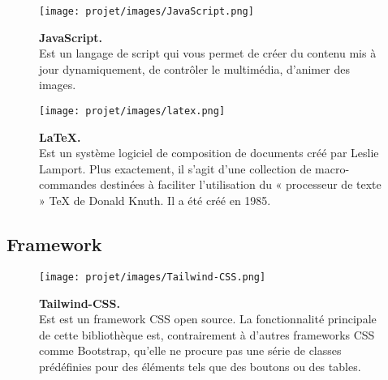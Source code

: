 \vspace{0.5cm}

\begin{figure}[H]
    \centering
    \begin{minipage}[c]{0.3\textwidth}
        \texttt{[image: projet/images/JavaScript.png]}
    \end{minipage}
    \hspace{1cm}
    \begin{minipage}[c]{0.6\textwidth}
        \textbf{JavaScript.}\\[0.5em]
       Est un langage de script qui vous permet de créer du contenu
mis à jour dynamiquement, de contrôler le multimédia, d’animer des
images. \cite{ref11}
    \end{minipage}
\end{figure}

\vspace{0.5cm}

\begin{figure}[H]
    \centering
    \begin{minipage}[c]{0.3\textwidth}
        \texttt{[image: projet/images/latex.png]}
    \end{minipage}
    \hspace{1cm}
    \begin{minipage}[c]{0.6\textwidth}
        \textbf{LaTeX.}\\[0.5em]
        Est un système logiciel de composition de documents créé par Leslie Lamport. Plus exactement, il s'agit d'une collection de macro-commandes destinées à faciliter l'utilisation du « processeur de texte » TeX de Donald Knuth. Il a été créé en 1985. \cite{ref12}
    \end{minipage}
\end{figure}
\subsection{Framework}
\begin{figure}[H]
    \centering
    \begin{minipage}[c]{0.3\textwidth}
        \texttt{[image: projet/images/Tailwind-CSS.png]}
    \end{minipage}
    \hspace{1cm}
    \begin{minipage}[c]{0.6\textwidth}
        \textbf{Tailwind-CSS.}\\[0.5em]
        Est est un framework CSS open source. La fonctionnalité principale de cette bibliothèque est, contrairement à d'autres frameworks CSS comme Bootstrap, qu'elle ne procure pas une série de classes prédéfinies pour des éléments tels que des boutons ou des tables.\cite{ref13}
    \end{minipage}
\end{figure}
\vspace{0.5cm}

